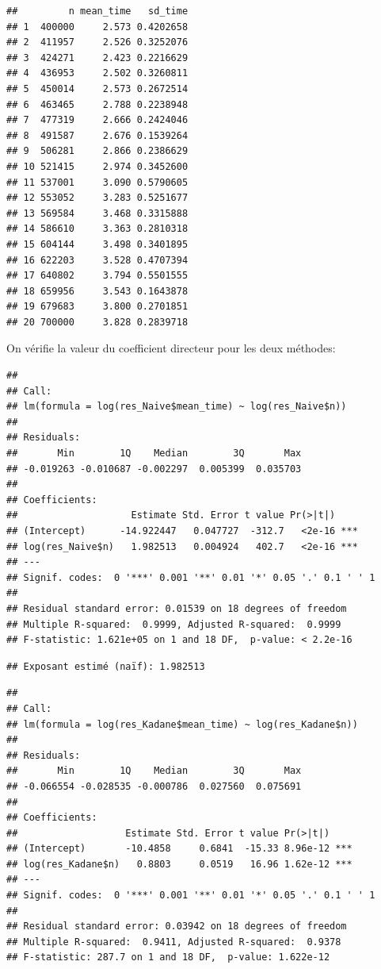 \documentclass[
]{article}
\begin{document}
\begin{verbatim}
##         n mean_time   sd_time
## 1  400000     2.573 0.4202658
## 2  411957     2.526 0.3252076
## 3  424271     2.423 0.2216629
## 4  436953     2.502 0.3260811
## 5  450014     2.573 0.2672514
## 6  463465     2.788 0.2238948
## 7  477319     2.666 0.2424046
## 8  491587     2.676 0.1539264
## 9  506281     2.866 0.2386629
## 10 521415     2.974 0.3452600
## 11 537001     3.090 0.5790605
## 12 553052     3.283 0.5251677
## 13 569584     3.468 0.3315888
## 14 586610     3.363 0.2810318
## 15 604144     3.498 0.3401895
## 16 622203     3.528 0.4707394
## 17 640802     3.794 0.5501555
## 18 659956     3.543 0.1643878
## 19 679683     3.800 0.2701851
## 20 700000     3.828 0.2839718
\end{verbatim}

On vérifie la valeur du coefficient directeur pour les deux méthodes:

\begin{verbatim}
## 
## Call:
## lm(formula = log(res_Naive$mean_time) ~ log(res_Naive$n))
## 
## Residuals:
##       Min        1Q    Median        3Q       Max 
## -0.019263 -0.010687 -0.002297  0.005399  0.035703 
## 
## Coefficients:
##                    Estimate Std. Error t value Pr(>|t|)    
## (Intercept)      -14.922447   0.047727  -312.7   <2e-16 ***
## log(res_Naive$n)   1.982513   0.004924   402.7   <2e-16 ***
## ---
## Signif. codes:  0 '***' 0.001 '**' 0.01 '*' 0.05 '.' 0.1 ' ' 1
## 
## Residual standard error: 0.01539 on 18 degrees of freedom
## Multiple R-squared:  0.9999, Adjusted R-squared:  0.9999 
## F-statistic: 1.621e+05 on 1 and 18 DF,  p-value: < 2.2e-16
\end{verbatim}

\begin{verbatim}
## Exposant estimé (naïf): 1.982513
\end{verbatim}

\begin{verbatim}
## 
## Call:
## lm(formula = log(res_Kadane$mean_time) ~ log(res_Kadane$n))
## 
## Residuals:
##       Min        1Q    Median        3Q       Max 
## -0.066554 -0.028535 -0.000786  0.027560  0.075691 
## 
## Coefficients:
##                   Estimate Std. Error t value Pr(>|t|)    
## (Intercept)       -10.4858     0.6841  -15.33 8.96e-12 ***
## log(res_Kadane$n)   0.8803     0.0519   16.96 1.62e-12 ***
## ---
## Signif. codes:  0 '***' 0.001 '**' 0.01 '*' 0.05 '.' 0.1 ' ' 1
## 
## Residual standard error: 0.03942 on 18 degrees of freedom
## Multiple R-squared:  0.9411, Adjusted R-squared:  0.9378 
## F-statistic: 287.7 on 1 and 18 DF,  p-value: 1.622e-12
\end{verbatim}
\end{document}

